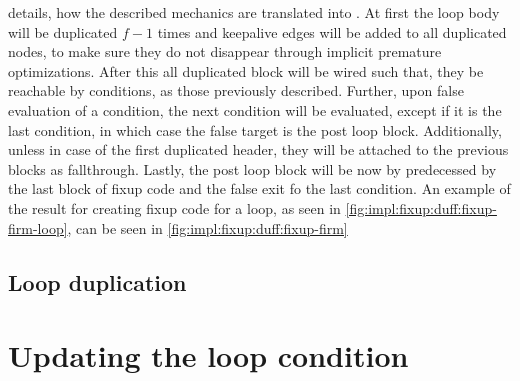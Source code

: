  details, how the described mechanics are translated into \libFIRM.
At first the loop body will be duplicated $f - 1$ times and keepalive edges will be added to all duplicated nodes, to make sure they do not disappear through implicit premature optimizations.
After this all duplicated block will be wired such that, they be reachable by conditions, as those previously described.
Further, upon false evaluation of a condition, the next condition will be evaluated, except if it is the last condition, in which case the false target is the post loop block.
Additionally, unless in case of the first duplicated header, they will be attached to the previous blocks as fallthrough.
Lastly, the post loop block will be now by predecessed by the last block of fixup code and the false exit fo the last condition.
An example of the result for creating fixup code for a loop, as seen in \cref{fig:impl:fixup:duff:fixup-firm-loop}, can be seen in \cref{fig:impl:fixup:duff:fixup-firm}







\subsection{Loop duplication}\label{sec:impl:fixup:loop}



\section{Updating the loop condition}\label{sec:impl:fixup:header-cond}

